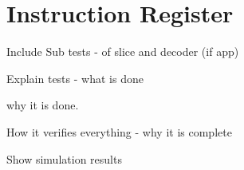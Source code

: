 
\section{Instruction Register}

Include Sub tests - of slice and decoder (if app)

Explain tests - what is done

why it is done.

How it verifies everything - why it is complete

Show simulation results

